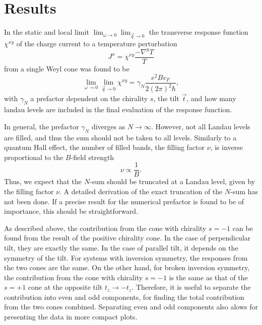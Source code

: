 \FloatBarrier
\section{Results}
In the static and local limit $\lim_{\omega \to 0} \lim_{\vec{q}\to 0}$ the  transverse response function $\chi^{xy}$ of the charge current to a temperature perturbation
\begin{equation}
  J^x = \chi^{xy} \frac{- \nabla^y T}{T}
\end{equation}
from a single Weyl cone was found  to be
\begin{equation}
  \lim_{\omega \to 0} \lim_{\vec{q}\to 0}
  \chi^{xy}
  =
  \gamma_{N}
  \frac{e^2 B v_F}{2 (2\pi )^2 \hbar },
\end{equation}
with $\gamma _N$ a prefactor dependent on the chirality \( s \), the tilt \( \vec{t} \), and  how many landau levels are included in the final evaluation of the response function.

In general, the prefactor \( \gamma_N \) diverges as $N\to \infty$.
However, not all Landau levels are filled, and thus the sum should not be taken to all levels.
Similarly to a quantum Hall effect, the number of filled bands, the filling factor $\nu $, is inverse proportional to the $B$-field strength
\begin{equation}
  \nu \propto \frac{1}{B}.
\end{equation}
Thus, we expect that the $N$-sum should be truncated at a Landau level, given by the filling factor $\nu $.
A detailed derivation of the exact truncation of the $N$-sum has not been done.
If a precise result for the numerical prefactor is found to be of importance, this should be straightforward.

As described above, the contribution from the cone with chirality \( s = -1 \) can be found from the result of the positive chirality cone.
In the case of perpendicular tilt, they are exactly the same.
In the case of parallel tilt, it depends on the symmetry of the tilt.
For systems with inversion symmetry, the responses from the two cones are the same.
On the other hand, for broken inversion symmetry, the contribution from the cone with chirality \( s=-1 \) is the same as that of the \( s=+1 \) cone at the opposite tilt \( t_z \to - t_z \).
Therefore, it is useful to separate the contribution into even and odd components, for finding the total contribution from the two cones combined.
Separating even and odd components also alows for presenting the data in more compact plots.

